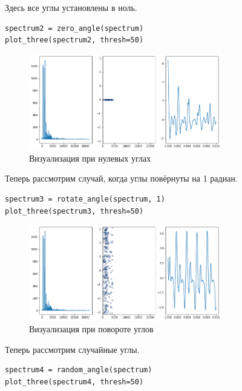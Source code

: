 \documentclass[a4paper,12pt]{report}
\begin{document}
Здесь все углы установлены в ноль.

\begin{lstlisting}[caption=Визуализация при нулевых углах]
spectrum2 = zero_angle(spectrum)
plot_three(spectrum2, thresh=50)
\end{lstlisting}

\begin{figure}[H]
        \centering
        \includegraphics[width=0.75\textwidth]{lab6_fig3_14.png}
        \caption{Визуализация при нулевых углах}
        \label{fig:lab6_fig3_14}
\end{figure}

Теперь рассмотрим случай, когда углы повёрнуты на 1 радиан.

\begin{lstlisting}[caption=Визуализация при повороте углов]
spectrum3 = rotate_angle(spectrum, 1)
plot_three(spectrum3, thresh=50)
\end{lstlisting}

\begin{figure}[H]
        \centering
        \includegraphics[width=0.75\textwidth]{lab6_fig3_15.png}
        \caption{Визуализация при повороте углов}
        \label{fig:lab6_fig3_15}
\end{figure}

Теперь рассмотрим случайные углы.

\begin{lstlisting}[caption=Визуализация при случайных углах]
spectrum4 = random_angle(spectrum)
plot_three(spectrum4, thresh=50)
\end{lstlisting}
\end{document}

